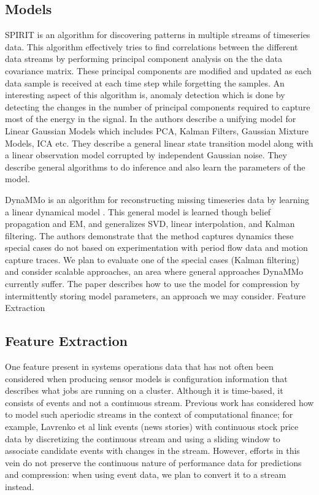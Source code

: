\subsection{Models}

SPIRIT \cite{papadimitriou2005streaming} is an algorithm for discovering patterns in multiple streams of timeseries data. This algorithm effectively tries to find correlations between the different data streams by performing principal component analysis on the the data covariance matrix. These principal components are modified and updated as each data sample is received at each time step while forgetting the samples. An interesting aspect of this algorithm is, anomaly detection which is done by detecting the changes in the number of principal components required to capture most of the energy in the signal.
In \cite{roweis1999unifying} the authors describe a unifying model for Linear Gaussian Models which includes PCA, Kalman Filters, Gaussian Mixture Models, ICA etc. They describe a general linear state transition model along with a linear observation model corrupted by independent Gaussian noise. They describe general algorithms to do inference and also learn the parameters of the model.

DynaMMo is an algorithm for reconstructing missing timeseries data by learning a linear dynamical model \cite{Li2009}. This general model is learned though belief propagation and EM, and generalizes SVD, linear interpolation, and Kalman filtering. The authors demonstrate that the method captures dynamics these special cases do not based on experimentation with period flow data and motion capture traces. We plan to evaluate one of the special cases (Kalman filtering) and consider scalable approaches, an area where general approaches DynaMMo currently suffer. The paper describes how to use the model for compression by intermittently storing model parameters, an approach we may consider.
Feature Extraction

\subsection{Feature Extraction}
One feature present in systems operations data that has not often been considered when producing sensor models is configuration information that describes what jobs are running on a cluster. Although it is time-based, it consists of events and not a continuous stream. Previous work has considered how to model such aperiodic streams in the context of computational finance; for example, Lavrenko et al \cite{Lavrenko2000} link events (news stories) with continuous stock price data by discretizing the continuous stream and using a sliding window to associate candidate events with changes in the stream. However, efforts in this vein do not preserve the continuous nature of performance data for predictions and compression: when using event data, we plan to convert it to a stream instead.

